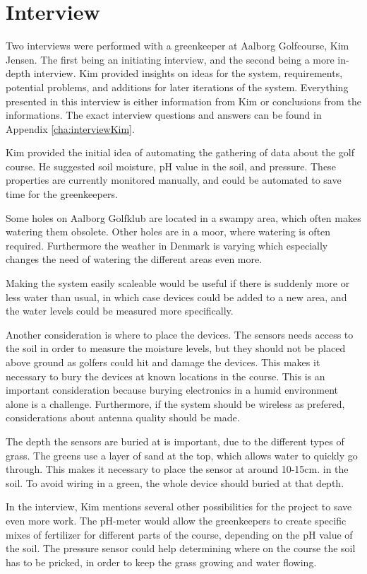 \section{Interview}
Two interviews were performed with a greenkeeper at Aalborg Golfcourse, Kim Jensen. The first being an initiating interview, and the second being a more in-depth interview. Kim provided insights on ideas for the system, requirements, potential problems, and additions for later iterations of the system. Everything presented in this interview is either information from Kim or conclusions from the informations. The exact interview questions and answers can be found in Appendix \ref{cha:interviewKim}. 

Kim provided the initial idea of automating the gathering of data about the golf course. He suggested soil moisture, pH value in the soil, and pressure. These properties are currently monitored manually, and could be automated to save time for the greenkeepers.

Some holes on Aalborg Golfklub are located in a swampy area, which often makes watering them obsolete. Other holes are in a moor, where watering is often required. Furthermore the weather in Denmark is varying which especially changes the need of watering the different areas even more. 

Making the system easily scaleable would be useful if there is suddenly more or less water than usual, in which case devices could be added to a new area, and the water levels could be measured more specifically. 

Another consideration is where to place the devices. The sensors needs access to the soil in order to measure the moisture levels, but they should not be placed above ground as golfers could hit and damage the devices. This makes it necessary to bury the devices at known locations in the course. This is an important consideration because burying electronics in a humid environment alone is a challenge. Furthermore, if the system should be wireless as prefered, considerations about antenna quality should be made.

The depth the sensors are buried at is important, due to the different types of grass. The greens use a layer of sand at the top, which allows water to quickly go through. This makes it necessary to place the sensor at around 10-15cm. in the soil. To avoid wiring in a green, the whole device should buried at that depth.

In the interview, Kim mentions several other possibilities for the project to save even more work. The pH-meter would allow the greenkeepers to create specific mixes of fertilizer for different parts of the course, depending on the pH value of the soil. The pressure sensor could help determining where on the course the soil has to be pricked, in order to keep the grass growing and water flowing.